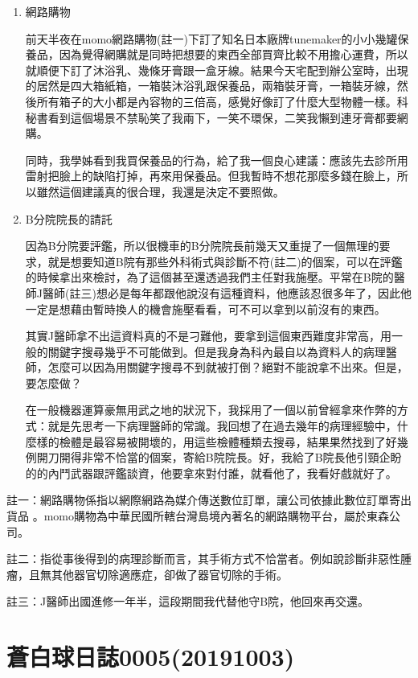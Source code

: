 \documentclass[a5paper, 12pt
]{book}
\begin{document}
\begin{enumerate}
\def\labelenumi{\arabic{enumi}.}
\item
  網路購物

  前天半夜在momo網路購物(註一)下訂了知名日本廠牌tunemaker的小小幾罐保養品，因為覺得網購就是同時把想要的東西全部買齊比較不用擔心運費，所以就順便下訂了沐浴乳、幾條牙膏跟一盒牙線。結果今天宅配到辦公室時，出現的居然是四大箱紙箱，一箱裝沐浴乳跟保養品，兩箱裝牙膏，一箱裝牙線，然後所有箱子的大小都是內容物的三倍高，感覺好像訂了什麼大型物體一樣。科秘書看到這個場景不禁恥笑了我兩下，一笑不環保，二笑我懶到連牙膏都要網購。

  同時，我學姊看到我買保養品的行為，給了我一個良心建議：應該先去診所用雷射把臉上的缺陷打掉，再來用保養品。但我暫時不想花那麼多錢在臉上，所以雖然這個建議真的很合理，我還是決定不要照做。
\item
  B分院院長的請託

  因為B分院要評鑑，所以很機車的B分院院長前幾天又重提了一個無理的要求，就是想要知道B院有那些外科術式與診斷不符(註二)的個案，可以在評鑑的時候拿出來檢討，為了這個甚至還透過我們主任對我施壓。平常在B院的醫師J醫師(註三)想必是每年都跟他說沒有這種資料，他應該忍很多年了，因此他一定是想藉由暫時換人的機會施壓看看，可不可以拿到以前沒有的東西。

  其實J醫師拿不出這資料真的不是刁難他，要拿到這個東西難度非常高，用一般的關鍵字搜尋幾乎不可能做到。但是我身為科內最自以為資料人的病理醫師，怎麼可以因為用關鍵字搜尋不到就被打倒？絕對不能說拿不出來。但是，要怎麼做？

  在一般機器運算豪無用武之地的狀況下，我採用了一個以前曾經拿來作弊的方式：就是先思考一下病理醫師的常識。我回想了在過去幾年的病理經驗中，什麼樣的檢體是最容易被開壞的，用這些檢體種類去搜尋，結果果然找到了好幾例開刀開得非常不恰當的個案，寄給B院院長。好，我給了B院長他引頸企盼的的內鬥武器跟評鑑談資，他要拿來對付誰，就看他了，我看好戲就好了。
\end{enumerate}

註一：網路購物係指以網際網路為媒介傳送數位訂單，讓公司依據此數位訂單寄出貨品
。momo購物為中華民國所轄台灣島境內著名的網路購物平台，屬於東森公司。

註二：指從事後得到的病理診斷而言，其手術方式不恰當者。例如說診斷非惡性腫瘤，且無其他器官切除適應症，卻做了器官切除的手術。

註三：J醫師出國進修一年半，這段期間我代替他守B院，他回來再交還。

\hypertarget{ux84bcux767dux7403ux65e5ux8a8c000520191003}{%
\section{蒼白球日誌0005(20191003)}\label{ux84bcux767dux7403ux65e5ux8a8c000520191003}}
\end{document}
